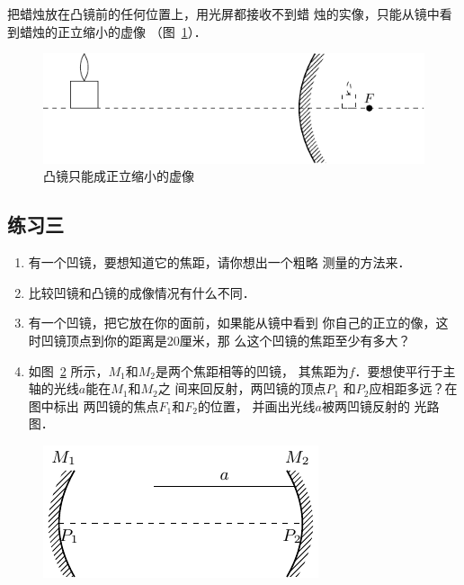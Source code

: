 把蜡烛放在凸镜前的任何位置上，用光屏都接收不到蜡
烛的实像，只能从镜中看到蜡烛的正立缩小的虚像
（图~\ref{fig_C_5-17}）．
\begin{figure}[htbp]
    \centering
    \includegraphics{fig/C/5-17.pdf}
    \caption{凸镜只能成正立缩小的虚像}\label{fig_C_5-17}
\end{figure}

\subsection*{练习三}
\begin{enumerate}
    \item 有一个凹镜，要想知道它的焦距，请你想出一个粗略
        测量的方法来．
    \item 比较凹镜和凸镜的成像情况有什么不同．
    \item 有一个凹镜，把它放在你的面前，如果能从镜中看到
        你自己的正立的像，这时凹镜顶点到你的距离是20厘米，那
        么这个凹镜的焦距至少有多大？
    \item 如图~\ref{fig_C_5-18} 所示，$M_1$和$M_2$是两个焦距相等的凹镜，
    其焦距为$f$．要想使平行于主轴的光线$a$能在$M_1$和$M_2$之
    间来回反射，两凹镜的顶点$P_1$
    和$P_2$应相距多远？在图中标出
    两凹镜的焦点$F_1$和$F_2$的位置，
    并画出光线$a$被两凹镜反射的
    光路图．
\end{enumerate}

\begin{figure}[htbp]
    \centering
    \includegraphics{fig/C/5-18.pdf}
    \caption{}\label{fig_C_5-18}
\end{figure}
 
